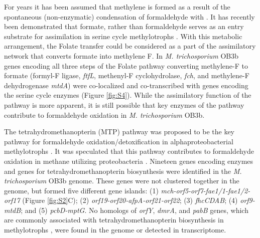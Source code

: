 For years it has been assumed that methylene  is formed as a result of the spontaneous (non-enzymatic) condensation of formaldehyde with  \cite{large1963}.
It has recently been demonstrated that formate, rather than formaldehyde serves as an entry substrate for assimilation in serine cycle methylotrophs \cite{crowther2008}.
With this metabolic arrangement, the Folate  transfer could be considered as a part of the assimilatory network that converts formate into methylene F.
In \textit{M. trichosporium} OB3b genes encoding all three steps of the Folate pathway converting methylene-F to formate (formyl-F ligase, \textit{ftfL}, methenyl-F cyclohydrolase, \textit{fch}, and methylene-F dehydrogenase \textit{mtdA}) were co-localized and co-transcribed with genes encoding the serine cycle enzymes (Figure \ref{fig:S4}).
While the assimilatory function of the pathway is more apparent, it is still possible that key enzymes of the pathway contribute to formaldehyde oxidation in \textit{M. trichosporium} OB3b.

The tetrahydromethanopterin (MTP) pathway was proposed to be the key pathway for formaldehyde oxidation/detoxification in alphaproteobacterial methylotrophs \cite{chistoserdova1998}.
It was speculated that this pathway contributes to formaldehyde oxidation in methane utilizing proteobacteria \cite{vorholt1999}.
Nineteen genes encoding enzymes and genes for tetrahydromethanopterin biosynthesis were identified in the \textit{M. trichosporium} OB3b genome.
These genes were not clustered together in the genome, but formed five different gene islands: (1) \textit{mch-orf5-orf7-fae1/1-fae1/2-orf17} (Figure \ref{fig:S2}C); (2) \textit{orf19-orf20-afpA-orf21-orf22}; (3) \textit{fhcCDAB}; (4) \textit{orf9-mtdB}; and (5) \textit{pcbD-mptG}.
No homologs of \textit{orfY}, \textit{dmrA}, and \textit{pabB} genes, which are commonly associated with tetrahydromethanopterin biosynthesis in methylotrophs \cite{caccamo2004, rasche2004, chistoserdova2005, kalyuzhnaya2005}, were found in the genome or detected in transcriptome.

